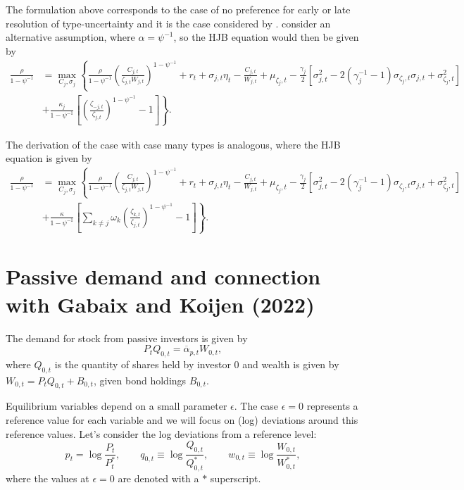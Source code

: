 \documentclass[11pt,english]{article}
\begin{document}
The formulation above corresponds to the case of no preference for early or late resolution of type-uncertainty and it is the case considered by \citet{di2017uncertainty}. \citet{garleanu2015young} consider an alternative assumption, where $\alpha = \psi^{-1}$, so the HJB equation would then be given by
\begin{align*}
    \frac{\rho}{1-\psi^{-1}} &= \max_{C_j,\sigma_j}\left\{ \frac{\rho }{1-\psi^{-1}}
     \left(\frac{C_{j,t}}{\zeta_{j,t} W_{j,t}} \right)^{1-\psi^{-1}}  +r_t + \sigma_{j,t} \eta_t - \frac{C_{j,t}}{W_{j,t}} + \mu_{\zeta_j,t} - \frac{\gamma_j}{2} \left[\sigma_{j,t}^2 -2 (\gamma_j^{-1}-1) \sigma_{\zeta_j,t} \sigma_{j,t}+ \sigma_{\zeta_j,t}^2\right]   \right.\\
     &+\left.\frac{\kappa_j}{1-\psi^{-1}} \left[\left( \frac{\zeta_{-j,t}}{\zeta_{j,t}}\right)^{1-\psi^{-1}} -1 \right]\right\}.
\end{align*}

The derivation of the case with case many types is analogous, where the HJB equation is given by
\begin{align*}
    \frac{\rho}{1-\psi^{-1}} &= \max_{C_j,\sigma_j}\left\{ \frac{\rho }{1-\psi^{-1}}
     \left(\frac{C_{j,t}}{\zeta_{j,t} W_{j,t}} \right)^{1-\psi^{-1}}  +r_t + \sigma_{j,t} \eta_t - \frac{C_{j,t}}{W_{j,t}} + \mu_{\zeta_j,t} - \frac{\gamma_j}{2} \left[\sigma_{j,t}^2 -2 (\gamma_j^{-1}-1) \sigma_{\zeta_j,t} \sigma_{j,t}+ \sigma_{\zeta_j,t}^2\right]   \right.\\
     &+\left.\frac{\kappa}{1-\psi^{-1}} \left[\sum_{k\neq j} \omega_k\left( \frac{\zeta_{k,t}}{\zeta_{j,t}}\right)^{1-\psi^{-1}} -1 \right]\right\}.
\end{align*}

\section{Passive demand and connection with Gabaix and Koijen (2022)}

The demand for stock from passive investors is given by
\begin{equation}
    P_t Q_{0,t} = \overline{\alpha}_{p,t} W_{0,t},
\end{equation}
where $Q_{0,t}$ is the quantity of shares held by investor $0$ and wealth is given by $W_{0,t} =  P_t Q_{0,t} + B_{0,t}$, given bond holdings $B_{0,t}$. 

Equilibrium variables depend on a small parameter $\epsilon $. The case $\epsilon = 0$ represents a reference value for each variable and we will focus on (log) deviations around this reference values. Let's consider the log deviations from a reference level:
\begin{equation}
    p_t = \log \frac{P_t}{P_t^*}, \qquad q_{0,t} \equiv \log \frac{Q_{0,t}}{Q_{0,t}^*}, \qquad w_{0,t}
\equiv \log \frac{W_{0,t}}{W^*_{0,t}}, 
\end{equation}
where the values at $\epsilon = 0$ are denoted with a $*$ superscript.
\end{document}
